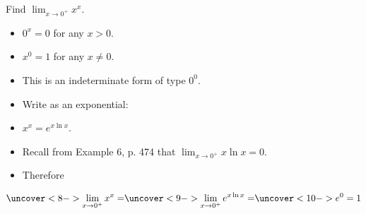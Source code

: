 \begin{frame}
\begin{example}[Example 10, p. 477]
Find $\lim_{x\rightarrow 0^+} x^x$.
\begin{itemize}
\item<2->  $0^x = 0$ for any $x > 0$.
\item<3->  $x^0 = 1$ for any $x \neq 0$.
\item<4->  This is an indeterminate form of type $0^0$.
\item<5->  Write as an exponential:
\item<6->  $x^x = e^{x\ln x}$.
\item<7->  Recall from Example 6, p. 474 that $\lim_{x\rightarrow 0^+} x\ln x = 0$.
\item<8->  Therefore
\end{itemize}
\[
\uncover<8->{ \lim_{x\rightarrow 0^+} x^x = }%
\uncover<9->{ \lim_{x\rightarrow 0^+} e^{x\ln x} = }%
\uncover<10->{  e^{0} = 1}%
\]
\end{example}
\end{frame}
